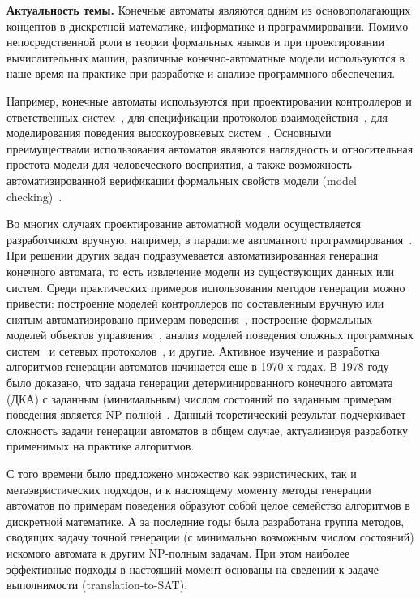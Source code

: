 \textbf{Актуальность темы.} 
Конечные автоматы являются одним из основополагающих концептов в дискретной математике, информатике и программировании.
Помимо непосредственной роли в теории формальных языков и при проектировании вычислительных машин, различные конечно-автоматные модели используются в наше время на практике при разработке и анализе программного обеспечения.

Например, конечные автоматы используются при проектировании контроллеров и ответственных систем~\cite{shalyto-automata-2010,DBLP:conf/setta/PatilDV15}, для спецификации протоколов взаимодействия~\cite{DBLP:conf/coordination/JongmansHA14}, для моделирования поведения высокоуровневых систем~\cite{DBLP:journals/ese/HeuleV13,wagner2006modeling}.
Основными преимуществами использования автоматов являются наглядность и относительная простота модели для человеческого восприятия, а также возможность автоматизированной верификации формальных свойств модели (model checking)~\cite{clarke2018model}.

Во многих случаях проектирование автоматной модели осуществляется разработчиком вручную, например, в парадигме автоматного программирования~\cite{shalyto-automata-2010}.
При решении других задач подразумевается автоматизированная генерация конечного автомата, то есть извлечение модели из существующих данных или систем.
Среди практических примеров использования методов генерации можно привести: построение моделей контроллеров по составленным вручную или снятым автоматизировано примерам поведения~\cite{DBLP:conf/etfa/ChivilikhinBUSS18}, построение формальных моделей объектов управления~\cite{DBLP:conf/etfa/BuzhinskyV17,DBLP:journals/tii/BuzhinskyV17}, анализ моделей поведения сложных программных систем~\cite{DBLP:journals/tosem/CookW98,DBLP:conf/sigsoft/BertolinoIPT09,DBLP:journals/ese/HeuleV13} и сетевых протоколов~\cite{DBLP:conf/sp/SivakornAPKJ17}, и другие.
Активное изучение и разработка алгоритмов генерации автоматов начинается еще в 1970-х годах.
В 1978 году было доказано, что задача генерации детерминированного конечного автомата (ДКА) с заданным (минимальным) числом состояний по заданным примерам поведения является NP-полной~\cite{DBLP:journals/iandc/Gold78}.
Данный теоретический результат подчеркивает сложность задачи генерации автоматов в общем случае, актуализируя разработку применимых на практике алгоритмов.

С того времени было предложено множество как эвристических, так и метаэвристических подходов, и к настоящему моменту методы генерации автоматов по примерам поведения образуют собой целое семейство алгоритмов в дискретной математике. А за последние годы была разработана группа методов, сводящих задачу точной генерации (с минимально возможным числом состояний) искомого автомата к другим NP-полным задачам. При этом наиболее эффективные подходы в настоящий момент основаны на сведении к задаче выполнимости (translation-to-SAT).

